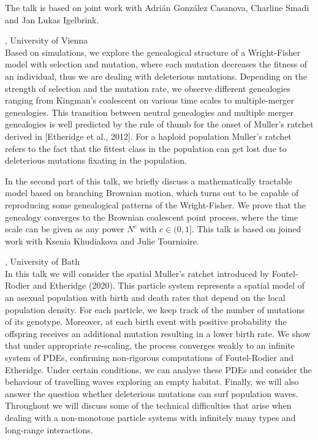 \documentclass[12pt,a4paper]{article}
\begin{document}
 The talk is based on joint work with Adri\'an Gonz\'alez Casanova, Charline Smadi and Jan Lukas Igelbrink. 

\bigskip\bigskip

, University of Vienna \\[2ex] Based on simulations, we explore the genealogical structure of a Wright-Fisher model with selection and mutation, where each mutation decreases the fitness of an individual, thus we are dealing with deleterious mutations. Depending on the strength of selection and the mutation rate, we observe different genealogies ranging from Kingman's coalescent on various time scales to multiple-merger genealogies. This transition between neutral genealogies and multiple merger genealogies is well predicted by the rule of thumb for the onset of Muller's ratchet derived in [Etheridge et al., 2012]. For a haploid population Muller's ratchet refers to the fact that the fittest class in the population can get lost due to deleterious mutations fixating in the population. 

 In the second part of this talk, we briefly discuss a mathematically tractable model based on branching Brownian motion, which turns out to be capable of reproducing some genealogical patterns of the Wright-Fisher. We prove that the genealogy converges to the Brownian coalescent point process, where the time scale can be given as any power $N^c$ with $c \in (0,1]$. This talk is based on joined work with Ksenia Khudiakova and Julie Tourniaire. 

\bigskip\bigskip

, University of Bath \\[2ex] In this talk we will consider the spatial Muller's ratchet introduced by Foutel-Rodier and Etheridge (2020). This particle system represents a spatial model of an asexual population with birth and death rates that depend on the local population density. For each particle, we keep track of the number of mutations of its genotype. Moreover, at each birth event with positive probability the offspring receives an additional mutation resulting in a lower birth rate. We show that under appropriate re-scaling, the process converges weakly to an infinite system of PDEs, confirming non-rigorous computations of Foutel-Rodier and Etheridge. Under certain conditions, we can analyse these PDEs and consider the behaviour of travelling waves exploring an empty habitat. Finally, we will also answer the question whether deleterious mutations can surf population waves. Throughout we will discuss some of the technical difficulties that arise when dealing with a non-monotone particle systems with infinitely many types and long-range interactions. 
\end{document}
